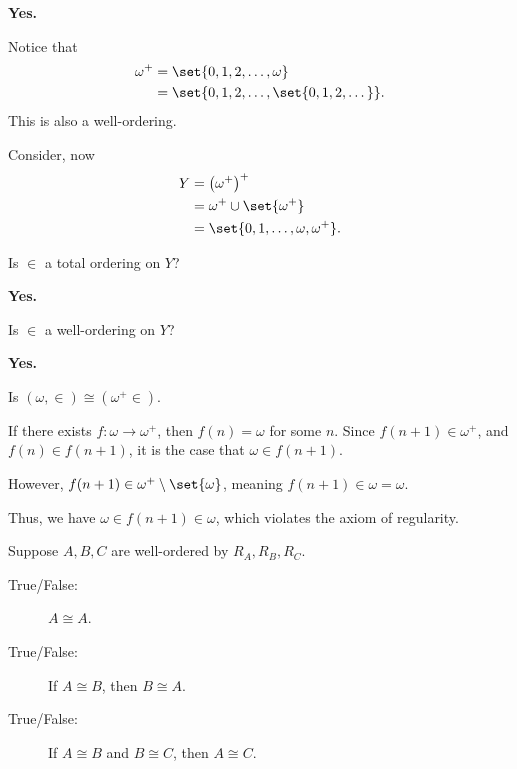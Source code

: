 \documentclass[10pt]{mypackage}
\begin{document}
\begin{answer}
  \textbf{Yes.}\newline

  Notice that
  \begin{align*}
    \omega^{+} &= \set{0,1,2,\dots,\omega}\\
               &= \set{0,1,2,\dots,\set{0,1,2,\dots}}.
  \end{align*}
  This is also a well-ordering.
\end{answer}
\begin{example}
  Consider, now
  \begin{align*}
    Y &= \left(\omega^{+}\right)^{+}\\
      &= \omega^{+}\cup \set{\omega^{+}}\\
      &= \set{0,1,\dots,\omega,\omega^{+}}.
  \end{align*}
  \begin{question}
    Is $\in$ a total ordering on $Y$?
  \end{question}
  \begin{answer}
    \textbf{Yes.}
  \end{answer}
  \begin{question}
    Is $\in$ a well-ordering on $Y$?
  \end{question}
  \begin{answer}
    \textbf{Yes.}
  \end{answer}
\end{example}
\begin{question}
  Is $\left(\omega,\in\right)\cong \left(\omega^{+}\in\right)$.
\end{question}
\begin{answer}
  If there exists $f: \omega \rightarrow \omega^{+}$, then $f(n) = \omega$ for some $n$. Since $f(n+1)\in \omega^{+}$, and $f(n)\in f(n+1)$, it is the case that $\omega \in f(n+1)$.\newline

  However, $f(n+1) \in \omega^{+}\setminus \set{\omega}$, meaning $f(n+1)\in \omega = \omega$.\newline

  Thus, we have $\omega \in f(n+1)\in \omega$, which violates the axiom of regularity.
\end{answer}
\begin{question}
  Suppose $A,B,C$ are well-ordered by $R_A,R_B,R_C$.
  \begin{description}
    \item[True/False:] $A\cong A$.
    \item[True/False:] If $A\cong B$, then $B\cong A$.
    \item[True/False:] If $A\cong B$ and $B\cong C$, then $A\cong C$.
  \end{description}
\end{question}
\end{document}
